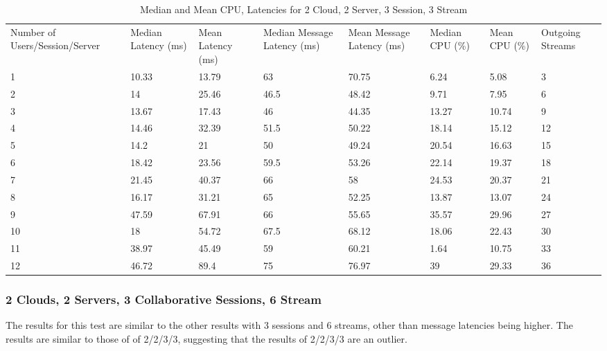 \begin{table}
\caption{Median and Mean CPU, Latencies for 2 Cloud, 2 Server, 3 Session, 3 Stream}
\label{table:2cld_2serv_3sess_3str}
\begin{tabu} to\linewidth{|X[c]|X[c]|X[c]|X[c]|X[c]|X[c]|X[c]|X[c]|}
\everyrow{\hline}
\hline
Number of Users/Session/Server & Median Latency (ms) & Mean Latency (ms) & Median Message Latency (ms) & Mean Message Latency (ms) & Median CPU (\%) & Mean CPU (\%) & Outgoing Streams\\
1 & 10.33 & 13.79 & 63 & 70.75 & 6.24 & 5.08 & 3 \\
2 & 14 & 25.46 & 46.5 & 48.42 & 9.71 & 7.95 & 6 \\
3 & 13.67 & 17.43 & 46 & 44.35 & 13.27 & 10.74 & 9 \\
4 & 14.46 & 32.39 & 51.5 & 50.22 & 18.14 & 15.12 & 12 \\
5 & 14.2 & 21 & 50 & 49.24 & 20.54 & 16.63 & 15 \\
6 & 18.42 & 23.56 & 59.5 & 53.26 & 22.14 & 19.37 & 18 \\
7 & 21.45 & 40.37 & 66 & 58 & 24.53 & 20.37 & 21 \\
8 & 16.17 & 31.21 & 65 & 52.25 & 13.87 & 13.07 & 24 \\
9 & 47.59 & 67.91 & 66 & 55.65 & 35.57 & 29.96 & 27 \\
10 & 18 & 54.72 & 67.5 & 68.12 & 18.06 & 22.43 & 30 \\
11 & 38.97 & 45.49 & 59 & 60.21 & 1.64 & 10.75 & 33 \\
12 & 46.72 & 89.4 & 75 & 76.97 & 39 & 29.33 & 36 \\
\end{tabu}
\end{table}


\subsubsection{2 Clouds, 2 Servers, 3 Collaborative Sessions, 6 Stream}

The results for this test are similar to the other results with 3 sessions and 6 streams, other than message latencies being higher. The results are similar to those of of 2/2/3/3, suggesting that the results of 2/2/3/3 are an outlier.

